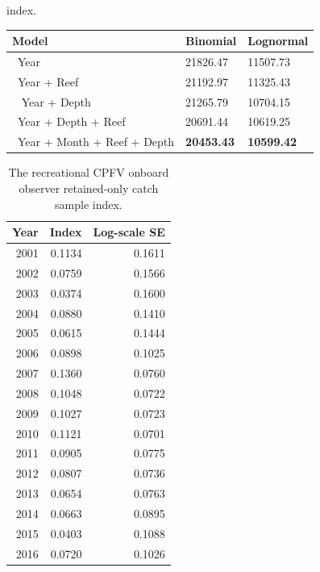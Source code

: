 \documentclass[12pt,]{article}
\begin{document}
\begin{table}[ht]
{                                          index.} 
\label{tab:Fleet12_RecPC_onboard_aic}
\begin{tabular}{lll}
  \hline
Model & Binomial & Lognormal \\ 
  \hline
~Year & 21826.47 & 11507.73 \\ 
  ~Year + Reef & 21192.97 & 11325.43 \\ 
  ~ Year + Depth & 21265.79 & 10704.15 \\ 
  ~Year + Depth + Reef & 20691.44 & 10619.25 \\ 
  ~Year + Month + Reef + Depth & \textbf{20453.43} & \textbf{10599.42} \\ 
   \hline
\end{tabular}
\end{table}\begin{table}[ht]
\centering
\caption{The recreational CPFV
                                            onboard observer retained-only
                                            catch sample index.} 
\label{tab:Fleet12_RecPC_onboard_index}
\begin{tabular}{rrr}
  \hline
Year & Index & Log-scale SE \\ 
  \hline
 2001 & 0.1134 & 0.1611 \\ 
   2002 & 0.0759 & 0.1566 \\ 
   2003 & 0.0374 & 0.1600 \\ 
   2004 & 0.0880 & 0.1410 \\ 
   2005 & 0.0615 & 0.1444 \\ 
   2006 & 0.0898 & 0.1025 \\ 
   2007 & 0.1360 & 0.0760 \\ 
   2008 & 0.1048 & 0.0722 \\ 
   2009 & 0.1027 & 0.0723 \\ 
   2010 & 0.1121 & 0.0701 \\ 
   2011 & 0.0905 & 0.0775 \\ 
   2012 & 0.0807 & 0.0736 \\ 
   2013 & 0.0654 & 0.0763 \\ 
   2014 & 0.0663 & 0.0895 \\ 
   2015 & 0.0403 & 0.1088 \\ 
   2016 & 0.0720 & 0.1026 \\ 
   \hline
\end{tabular}
\end{table}

\FloatBarrier
\end{document}
